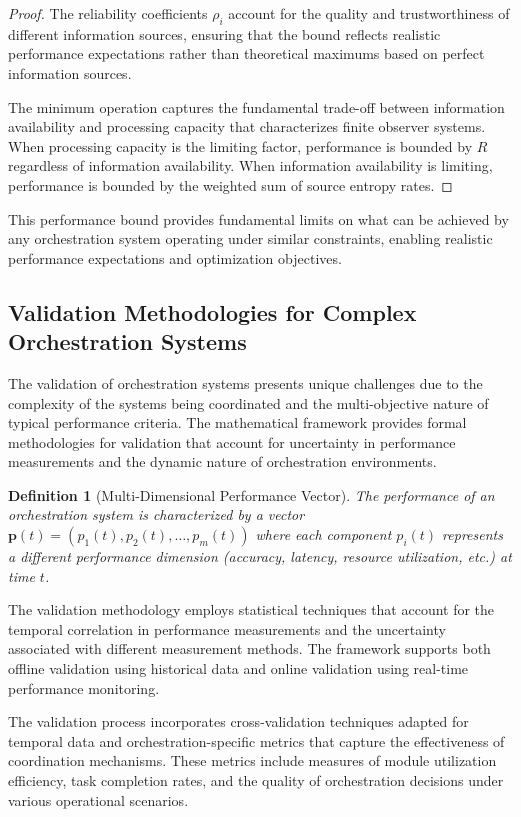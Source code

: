 \documentclass[12pt,a4paper]{article}
\newtheorem{definition}[theorem]{Definition}
\begin{document}
{{{\begin{proof}
The reliability coefficients $\rho_i$ account for the quality and trustworthiness of different information sources, ensuring that the bound reflects realistic performance expectations rather than theoretical maximums based on perfect information sources.

The minimum operation captures the fundamental trade-off between information availability and processing capacity that characterizes finite observer systems. When processing capacity is the limiting factor, performance is bounded by $R$ regardless of information availability. When information availability is limiting, performance is bounded by the weighted sum of source entropy rates.
\end{proof}

This performance bound provides fundamental limits on what can be achieved by any orchestration system operating under similar constraints, enabling realistic performance expectations and optimization objectives.

\subsection{Validation Methodologies for Complex Orchestration Systems}

The validation of orchestration systems presents unique challenges due to the complexity of the systems being coordinated and the multi-objective nature of typical performance criteria. The mathematical framework provides formal methodologies for validation that account for uncertainty in performance measurements and the dynamic nature of orchestration environments.

\begin{definition}[Multi-Dimensional Performance Vector]
The performance of an orchestration system is characterized by a vector $\mathbf{p}(t) = (p_1(t), p_2(t), \ldots, p_m(t))$ where each component $p_i(t)$ represents a different performance dimension (accuracy, latency, resource utilization, etc.) at time $t$.
\end{definition}

The validation methodology employs statistical techniques that account for the temporal correlation in performance measurements and the uncertainty associated with different measurement methods. The framework supports both offline validation using historical data and online validation using real-time performance monitoring.

The validation process incorporates cross-validation techniques adapted for temporal data and orchestration-specific metrics that capture the effectiveness of coordination mechanisms. These metrics include measures of module utilization efficiency, task completion rates, and the quality of orchestration decisions under various operational scenarios.

}}}
\end{document}
